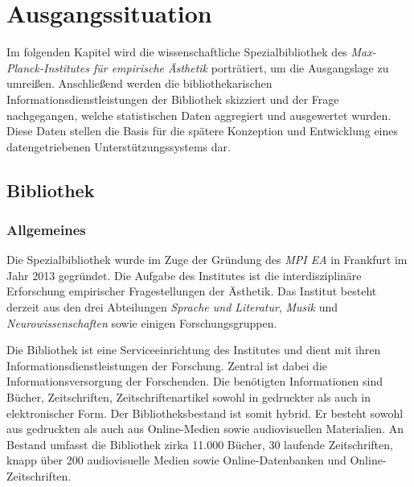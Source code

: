 \chapter{Ausgangssituation}
\label{chap:three}
Im folgenden Kapitel wird die wissenschaftliche Spezialbibliothek des \textit{Max-Planck-Institutes für empirische Ästhetik} porträtiert,
um die Ausgangslage zu umreißen.
Anschließend werden die bibliothekarischen Informationsdienstleistungen der Bibliothek skizziert und der Frage nachgegangen, 
welche statistischen Daten aggregiert und ausgewertet wurden. Diese Daten stellen die Basis für die spätere Konzeption und Entwicklung eines datengetriebenen Unterstützungssystems dar.

\section{Bibliothek}
\label{chap:three_one}
\subsection{Allgemeines}
Die Spezialbibliothek wurde im Zuge der Gründung des \textit{\acrshort{MPI EA}}
in Frankfurt im Jahr 2013 gegründet. Die Aufgabe des Institutes ist die interdisziplinäre Erforschung 
empirischer Fragestellungen der Ästhetik. Das Institut besteht derzeit aus den drei Abteilungen \textit{Sprache und Literatur}, 
\textit{Musik} und \textit{Neurowissenschaften} sowie einigen Forschungsgruppen. %



Die Bibliothek ist eine Serviceeinrichtung des Institutes und dient mit ihren Informationsdienstleistungen 
der Forschung.
Zentral ist dabei die Informationsversorgung der Forschenden. Die benötigten Informationen sind Bücher, 
Zeitschriften, Zeitschriftenartikel sowohl in gedruckter als auch in elektronischer Form.
Der Bibliotheksbestand ist somit hybrid. Er besteht sowohl aus gedruckten als auch aus Online-Medien sowie 
audiovisuellen Materialien. An Bestand umfasst die Bibliothek zirka 11.000 Bücher, 30 laufende Zeitschriften, 
knapp über 200 audiovisuelle Medien sowie Online-Datenbanken
und Online-Zeitschriften.

